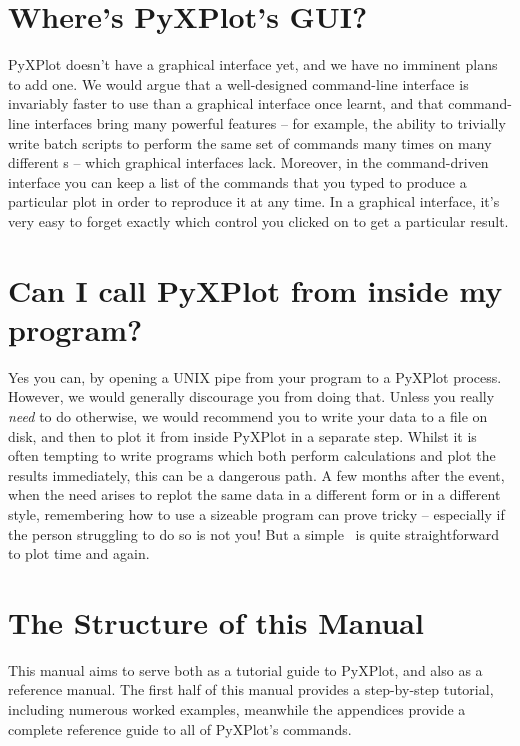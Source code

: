 \section{Where's PyXPlot's GUI?}

PyXPlot doesn't have a graphical interface yet, and we have no imminent plans
to add one. We would argue that a well-designed command-line interface is
invariably faster to use than a graphical interface once learnt, and that
command-line interfaces bring many powerful features -- for example, the
ability to trivially write batch scripts to perform the same set of commands
many times on many different \datafile s -- which graphical interfaces lack.
Moreover, in the command-driven interface you can keep a list of the commands
that you typed to produce a particular plot in order to reproduce it at any
time. In a graphical interface, it's very easy to forget exactly which control
you clicked on to get a particular result.

\section{Can I call PyXPlot from inside my program?}

Yes you can, by opening a UNIX pipe from your program to a PyXPlot process.
However, we would generally discourage you from doing that.  Unless you really
{\it need} to do otherwise, we would recommend you to write your data to a file
on disk, and then to plot it from inside PyXPlot in a separate step.  Whilst it
is often tempting to write programs which both perform calculations and plot
the results immediately, this can be a dangerous path. A few months after the
event, when the need arises to replot the same data in a different form or in a
different style, remembering how to use a sizeable program can prove tricky --
especially if the person struggling to do so is not you! But a simple
\datafile\ is quite straightforward to plot time and again.

\section{The Structure of this Manual}

This manual aims to serve both as a tutorial guide to PyXPlot, and also as a
reference manual. The first half of this manual provides a step-by-step
tutorial, including numerous worked examples, meanwhile the appendices provide
a complete reference guide to all of PyXPlot's commands.

